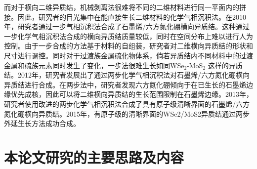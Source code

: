     而对于横向二维异质结，机械剥离法很难将不同的二维材料进行同一平面内的拼接。因此，研究者的目光集中在能直接生长二维材料的化学气相沉积法。在2010年，研究者通过一步气相沉积法合成了石墨烯/六方氮化硼横向异质结。这种通过一步化学气相沉积法合成的横向异质结质量较低，同时在空间分布上难以进行人为控制。由于一步合成的方法基于材料的自组装，研究者对二维横向异质结的形状和尺寸进行调控。同时对于过渡族金属硫化物体系，倘若异质结内不同材料中的过渡金属和硫族元素同时发生了变化，一步法很难生长如同WSe$_2$-MoS$_2$ 这样的异质结。2012年，研究者发展出了通过两步化学气相沉积法对石墨烯/六方氮化硼横向异质结进行合成。在两步法中，研究者发现六方氮化硼倾向于在已生长的石墨烯边缘优先成核，因此可以将二维横向异质结的生长范围限制在石墨烯边缘。2013年，研究者使用改进的两步化学气相沉积法合成了具有原子级清晰界面的石墨烯/六方氮化硼横向异质结。2015年，有原子级的清晰界面的WSe2/MoS2异质结通过两步外延生长方法成功合成。

\section{本论文研究的主要思路及内容}
